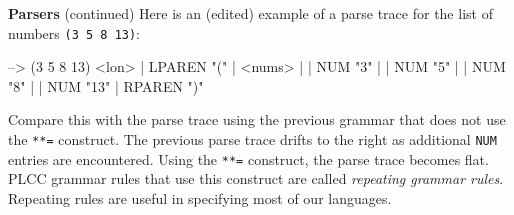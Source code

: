 \begin{minipage}[t]{\sw}
\slidenumber
\LARGE
{\bf Parsers} (continued)\exx
\Large
\emm\LightBox{\MYlonGrammarKleene}\exx
\LARGE
Here is an (edited) example
of a parse trace for the list of numbers \verb'(3 5 8 13)':
\begin{qv}
--> (3 5 8 13)
<lon>
| LPAREN "("
| <nums>
| | NUM "3"
| | NUM "5"
| | NUM "8"
| | NUM "13"
| RPAREN ")"
\end{qv}
Compare this with the parse trace using the previous grammar
that does not use the \verb'**=' construct.
The previous parse trace drifts to the right
as additional \verb'NUM' entries are encountered.
Using the \verb'**=' construct,
the parse trace becomes flat.\exx
PLCC grammar rules that use this construct
are called {\em repeating grammar rules}.
Repeating rules are useful in specifying most of our languages.
\end{minipage}
\clearpage
